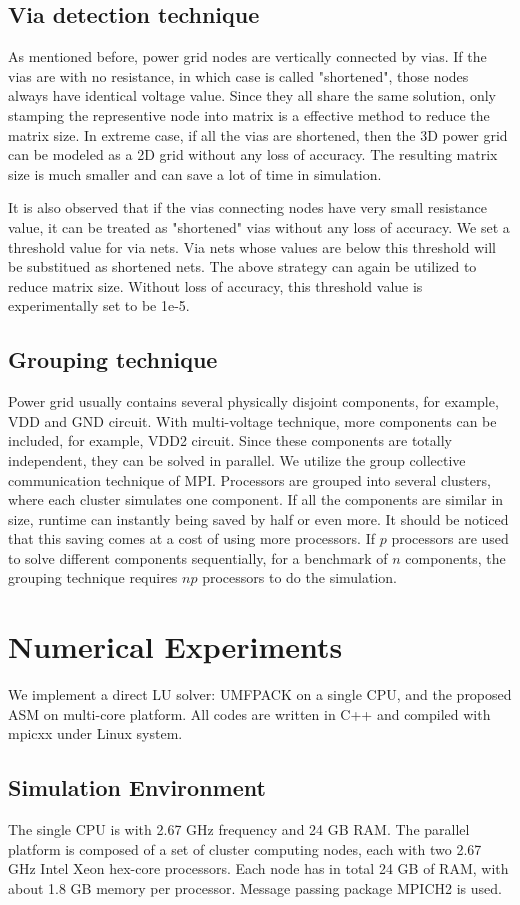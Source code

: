 \documentclass{sig-alternate}
\begin{document}
  \subsection{Via detection technique}
	As mentioned before, power grid nodes are vertically connected by vias. If the vias are with no 
	resistance, in which case is called "shortened", those nodes always have identical voltage value. Since they all share the same
	solution, only stamping the representive
	node into matrix is a effective method to reduce the matrix size. In extreme case, if all the
	vias are shortened, then the 3D power grid can be modeled as a 2D grid without any loss of accuracy. The resulting matrix size
	is much smaller and can save a lot of time in simulation. 
 
	It is also observed that if the vias connecting nodes have very small resistance value, it can be treated as "shortened" vias 
	without any loss of accuracy. We set a threshold value for via nets. Via nets 
	whose values are below this threshold will be substitued as shortened nets. The above strategy can again be utilized to reduce 
	matrix size. Without loss of accuracy, this threshold value is experimentally set to be 1e-5. 
  \subsection{Grouping technique} 
	Power grid usually contains several physically disjoint components, for example, VDD and GND circuit. With multi-voltage 
	technique, more components can be included, for example, VDD2 circuit. Since these components are totally independent, they can
	be solved in parallel. We utilize the group collective 
	communication technique of MPI. Processors are grouped into several clusters, where each cluster simulates one component. 
	If all the components are similar in size, runtime can instantly being saved by half or even more. 
	It should be noticed that this saving comes at a cost of using more processors. If $p$ processors are used to 
	solve different components sequentially, for a benchmark of $n$ components, the grouping technique requires $np$ processors to
	do the simulation.  
\section{Numerical Experiments}
	We implement a direct LU solver: UMFPACK on a single CPU, and the proposed ASM on multi-core platform. 
	All codes are written in C++ and compiled with mpicxx under Linux system. 
  \subsection{Simulation Environment}
	The single CPU is with 2.67 GHz frequency and 24 GB RAM. The parallel platform is composed of a set of cluster 
	computing nodes, each with two 2.67 GHz Intel Xeon hex-core processors. Each node has in total 24 GB of RAM, with about 
	1.8 GB memory per processor. Message passing package MPICH2 is used.  
\end{document}
